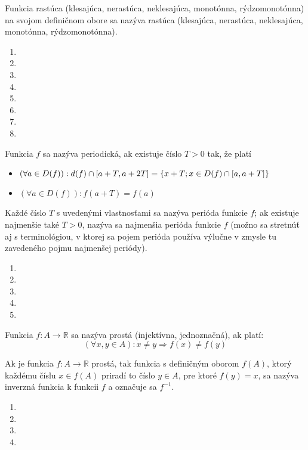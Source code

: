 Funkcia rastúca (klesajúca, nerastúca, neklesajúca, monotónna, rýdzomonotónna)
na svojom definičnom obore sa nazýva rastúca (klesajúca, nerastúca, neklesajúca,
monotónna, rýdzomonotónna).

\begin{enumerate}[resume]
  \item {}
  \item {}
  \item {}
  \showanswers
  \item {}
  \hideanswers
  \item {}
  \item {}
  \item {}
  \item {}
\end{enumerate}

Funkcia $f$ sa nazýva periodická, ak existuje číslo $T>0$ tak, že platí
\begin{itemize}
\item
  $
    (\forall a\in D(f)):
      d(f)\cap \interval{a+T}{a+2T}=\{x+T;x\in D(f)\cap \interval{a}{a + T}\}
  $
\item  $(\forall a \in D(f)):f(a+T)=f(a)$
\end{itemize}

Každé číslo $T$ s uvedenými vlastnosťami sa nazýva perióda funkcie $f$; ak
existuje najmenšie také $T>0$, nazýva sa najmenšia perióda funkcie $f$ (možno sa
stretnúť aj s terminológiou, v ktorej sa pojem perióda používa výlučne v zmysle
tu zavedeného pojmu najmenšej periódy).

\begin{enumerate}[resume]
  \item {}
  \item {}
  \item {}
  \item {}
  \item {}
\end{enumerate}

Funkcia $f:A \rightarrow\mathbb{R}$ sa nazýva prostá (injektívna, jednoznačná),
ak platí:
\[
  (\forall x,y\in A):
    x \neq y \Rightarrow f(x) \neq f(y)
\]

Ak je funkcia $f:A \rightarrow \mathbb{R}$ prostá, tak funkcia s definičným
oborom $f(A)$, ktorý každému číslu $x\in f(A)$ priradí to číslo $y\in A$, pre
ktoré $f(y)=x$, sa nazýva inverzná funkcia k funkcii $f$ a označuje sa $f^{-1}$.

\begin{enumerate}[resume]
  \showanswers
    \item {}
  \hideanswers
  \item {}
  \item {}
  \item {}
\end{enumerate}
